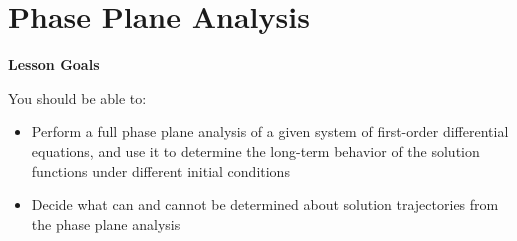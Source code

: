 \documentclass[main]{subfiles}
\begin{document}
\ifSubfilesClassLoaded{%
  \chaptermark{\chapterthree}
}{}

\section{Phase Plane Analysis} \label{ws3-10}
\begin{framed}
\centerline{\textbf{Lesson Goals}}

You should be able to:
\begin{itemize}
\item Perform a full phase plane analysis of a given system of first-order differential equations, and use it to determine the long-term behavior of the solution functions under different initial conditions
\item Decide what can and cannot be determined about solution trajectories from the phase plane analysis
\end{itemize}
\end{framed}
\end{document}

